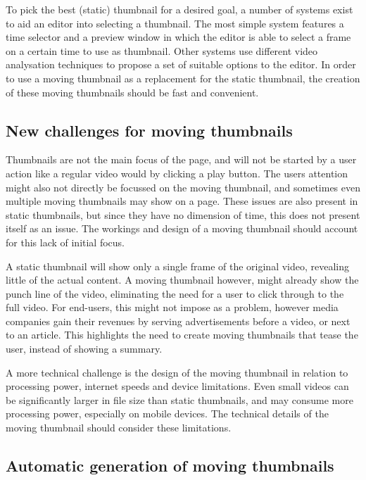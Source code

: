 \documentclass{../resources/acm_proc_article-sp}
\begin{document}
To pick the best (static) thumbnail for a desired goal, a number of systems exist to aid an editor into selecting a thumbnail. The most simple system features a time selector and a preview window in which the editor is able to select a frame on a certain time to use as thumbnail. Other systems use different video analysation techniques to propose a set of suitable options to the editor. In order to use a moving thumbnail as a replacement for the static thumbnail, the creation of these moving thumbnails should be fast and convenient.

\subsection{New challenges for moving thumbnails}

Thumbnails are not the main focus of the page, and will not be started by a user action like a regular video would by clicking a play button. The users attention might also not directly be focussed on the moving thumbnail, and sometimes even multiple moving thumbnails may show on a page. These issues are also present in static thumbnails, but since they have no dimension of time, this does not present itself as an issue. The workings and design of a moving thumbnail should account for this lack of initial focus.

A static thumbnail will show only a single frame of the original video, revealing little of the actual content. A moving thumbnail however, might already show the punch line of the video, eliminating the need for a user to click through to the full video. For end-users, this might not impose as a problem, however media companies gain their revenues by serving advertisements before a video, or next to an article. This highlights the need to create moving thumbnails that tease the user, instead of showing a summary.

A more technical challenge is the design of the moving thumbnail in relation to processing power, internet speeds and device limitations. Even small videos can be significantly larger in file size than static thumbnails, and may consume more processing power, especially on mobile devices. The technical details of the moving thumbnail should consider these limitations.

\subsection{Automatic generation of moving thumbnails}
\end{document}

